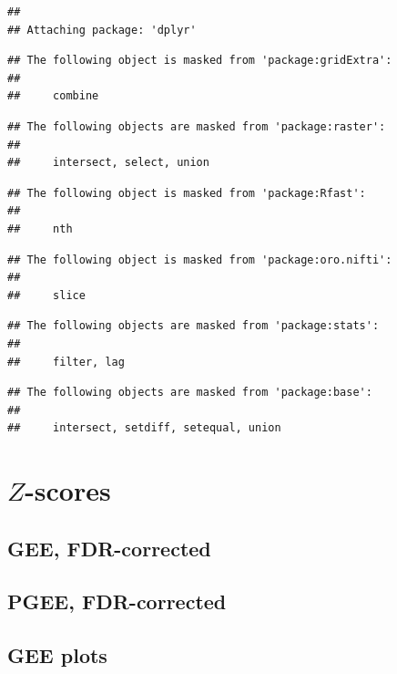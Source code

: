 \documentclass[]{article}
\begin{document}
\begin{verbatim}
## 
## Attaching package: 'dplyr'
\end{verbatim}

\begin{verbatim}
## The following object is masked from 'package:gridExtra':
## 
##     combine
\end{verbatim}

\begin{verbatim}
## The following objects are masked from 'package:raster':
## 
##     intersect, select, union
\end{verbatim}

\begin{verbatim}
## The following object is masked from 'package:Rfast':
## 
##     nth
\end{verbatim}

\begin{verbatim}
## The following object is masked from 'package:oro.nifti':
## 
##     slice
\end{verbatim}

\begin{verbatim}
## The following objects are masked from 'package:stats':
## 
##     filter, lag
\end{verbatim}

\begin{verbatim}
## The following objects are masked from 'package:base':
## 
##     intersect, setdiff, setequal, union
\end{verbatim}

\hypertarget{z-scores}{%
\section{\texorpdfstring{\(Z\)-scores}{Z-scores}}\label{z-scores}}

\hypertarget{gee-fdr-corrected}{%
\subsection{GEE, FDR-corrected}\label{gee-fdr-corrected}}

\hypertarget{pgee-fdr-corrected}{%
\subsection{PGEE, FDR-corrected}\label{pgee-fdr-corrected}}

\hypertarget{gee-plots}{%
\subsection{GEE plots}\label{gee-plots}}
\end{document}
